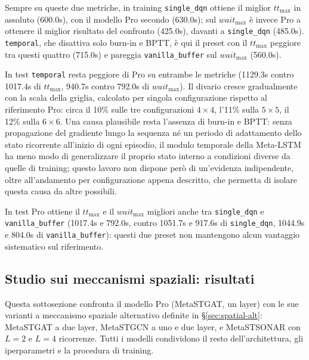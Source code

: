 Sempre su queste due metriche, in training \texttt{single\_dqn} ottiene il
miglior $tt_{\max}$ in assoluto (600.0s), con il modello Pro secondo
(630.0s); sul $wait_{\max}$ è invece Pro a ottenere il miglior risultato
del confronto (425.0s), davanti a \texttt{single\_dqn} (485.0s).
\texttt{temporal}, che disattiva solo burn-in e BPTT, è qui il preset con
il $tt_{\max}$ peggiore tra questi quattro (715.0s) e pareggia
\texttt{vanilla\_buffer} sul $wait_{\max}$ (560.0s).

In test \texttt{temporal} resta peggiore di Pro su entrambe le metriche
(1129.3s contro 1017.4s di $tt_{\max}$, 940.7s contro 792.0s di
$wait_{\max}$). Il divario cresce gradualmente con la scala della griglia,
calcolato per singola configurazione rispetto al riferimento Pro: circa
il 10\% sulle tre configurazioni $4\times4$, l'11\% sulla $5\times5$, il
12\% sulla $6\times6$. Una causa plausibile
resta l'assenza di burn-in e BPTT: senza propagazione del gradiente lungo
la sequenza né un periodo di adattamento dello stato ricorrente all'inizio
di ogni episodio, il modulo temporale della Meta-LSTM ha meno modo di
generalizzare il proprio stato interno a condizioni diverse da quelle di
training; questo lavoro non dispone però di un'evidenza indipendente,
oltre all'andamento per configurazione appena descritto, che permetta di
isolare questa causa da altre possibili.

\begin{sloppypar}
In test Pro ottiene il $tt_{\max}$ e il $wait_{\max}$ migliori anche tra
\texttt{single\_dqn} e \texttt{vanilla\_buffer} (1017.4s e 792.0s, contro
1051.7s e 917.6s di \texttt{single\_dqn}, 1044.9s e 804.0s di
\texttt{vanilla\_buffer}): questi due preset non mantengono alcun
vantaggio sistematico sul riferimento.
\end{sloppypar}

\subsection{Studio sui meccanismi spaziali: risultati}
\label{sec:confronto-spaziale}

Questa sottosezione confronta il modello Pro (MetaSTGAT, un layer)
con le sue varianti a meccanismo spaziale alternativo definite in
§\ref{sec:spatial-alt}: MetaSTGAT a due layer, MetaSTGCN a uno e due
layer, e MetaSTSONAR con $L=2$ e $L=4$ ricorrenze. Tutti i modelli
condividono il resto dell'architettura, gli iperparametri e la procedura di training.


